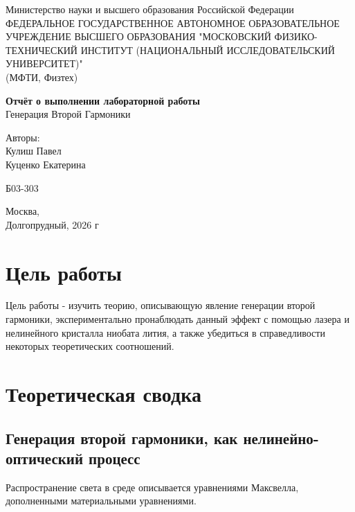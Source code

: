 \documentclass[12pt,a5paper,titlepage, main = russian]{article}
\begin{document}
\begin{titlepage}
\begin{center}
    \small{Министерство науки и высшего образования Российской Федерации}\\
    ФЕДЕРАЛЬНОЕ ГОСУДАРСТВЕННОЕ АВТОНОМНОЕ ОБРАЗОВАТЕЛЬНОЕ УЧРЕЖДЕНИЕ ВЫСШЕГО ОБРАЗОВАНИЯ "МОСКОВСКИЙ ФИЗИКО-ТЕХНИЧЕСКИЙ ИНСТИТУТ (НАЦИОНАЛЬНЫЙ ИССЛЕДОВАТЕЛЬСКИЙ УНИВЕРСИТЕТ)"\\
    (МФТИ, Физтех)
\end{center}
\vspace{4.5cm}
{\huge
    \begin{center}
        {\bf Отчёт о выполнении лабораторной работы}\\
        Генерация Второй Гармоники
    \end{center}
}
\vspace{1.5cm}
\begin{flushright}
    {\large Авторы:\\  
Кулиш Павел \\
Куценко Екатерина \\
        \vspace{0.2cm}
        
        Б03-303}
\end{flushright}
\vspace{0.5cm}
\begin{center}
        Москва, \\
        Долгопрудный, 2026 г
\end{center}

\end{titlepage}


\tableofcontents
\newpage



\section{Цель работы}
Цель работы - изучить теорию, описывающую явление генерации второй гармоники, экспериментально пронаблюдать данный эффект с помощью лазера и нелинейного кристалла ниобата лития, а также убедиться в справедливости некоторых теоретических соотношений.

\section{Теоретическая сводка}
\subsection*{Генерация второй гармоники, как нелинейно-оптический
процесс}
Распространение света в среде описывается уравнениями Максвелла, дополненными материальными уравнениями.
\end{document}
